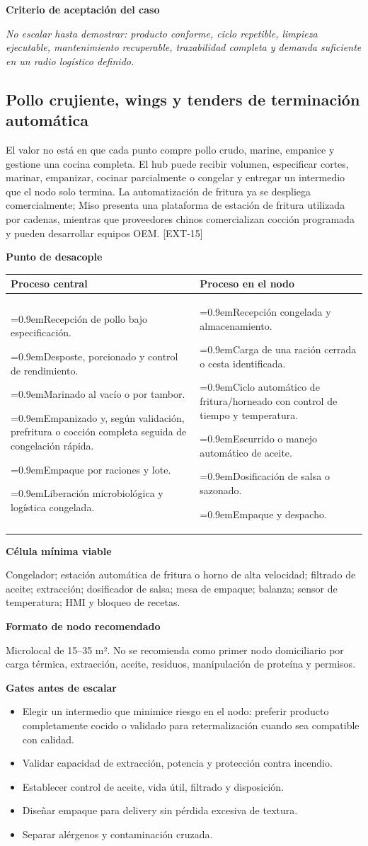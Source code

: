 \documentclass[11pt,a4paper]{article}
\makeatletter
\newcommand{\etiqueta}[1]{\par\medskip\noindent\textbf{#1}\par\nopagebreak\smallskip}
\newcommand{\ti}{\par\hangindent=0.9em\hangafter=1\noindent\makebox[0.9em][l]{\textbullet}}
\newcommand{\desacople}[2]{\etiqueta{Punto de desacople}
  {\small\noindent\begin{tabularx}{\textwidth}{@{}>{\raggedright\arraybackslash}X>{\raggedright\arraybackslash}X@{}}
  \toprule \textbf{Proceso central} & \textbf{Proceso en el nodo}\\ \midrule
  #1 & #2\\ \bottomrule\end{tabularx}}\par}
\newcommand{\criterio}{\etiqueta{Criterio de aceptación del caso}
  \noindent\textit{No escalar hasta demostrar: producto conforme, ciclo repetible, limpieza ejecutable,
  mantenimiento recuperable, trazabilidad completa y demanda suficiente en un radio logístico definido.}\par}
\makeatother
\begin{document}
\criterio

\subsection{Pollo crujiente, wings y tenders de terminación automática}
El valor no está en que cada punto compre pollo crudo, marine, empanice y gestione una cocina completa. El
hub puede recibir volumen, especificar cortes, marinar, empanizar, cocinar parcialmente o congelar y
entregar un intermedio que el nodo solo termina. La automatización de fritura ya se despliega
comercialmente; Miso presenta una plataforma de estación de fritura utilizada por cadenas, mientras que
proveedores chinos comercializan cocción programada y pueden desarrollar equipos OEM. [EXT-15]

\desacople{%
\ti Recepción de pollo bajo especificación.
\ti Desposte, porcionado y control de rendimiento.
\ti Marinado al vacío o por tambor.
\ti Empanizado y, según validación, prefritura o cocción completa seguida de congelación rápida.
\ti Empaque por raciones y lote.
\ti Liberación microbiológica y logística congelada.}{%
\ti Recepción congelada y almacenamiento.
\ti Carga de una ración cerrada o cesta identificada.
\ti Ciclo automático de fritura/horneado con control de tiempo y temperatura.
\ti Escurrido o manejo automático de aceite.
\ti Dosificación de salsa o sazonado.
\ti Empaque y despacho.}

\etiqueta{Célula mínima viable}
Congelador; estación automática de fritura o horno de alta velocidad; filtrado de aceite; extracción;
dosificador de salsa; mesa de empaque; balanza; sensor de temperatura; HMI y bloqueo de recetas.

\etiqueta{Formato de nodo recomendado}
Microlocal de 15--35 m². No se recomienda como primer nodo domiciliario por carga térmica, extracción,
aceite, residuos, manipulación de proteína y permisos.

\etiqueta{Gates antes de escalar}
\begin{itemize}
\item Elegir un intermedio que minimice riesgo en el nodo: preferir producto completamente cocido o
validado para retermalización cuando sea compatible con calidad.
\item Validar capacidad de extracción, potencia y protección contra incendio.
\item Establecer control de aceite, vida útil, filtrado y disposición.
\item Diseñar empaque para delivery sin pérdida excesiva de textura.
\item Separar alérgenos y contaminación cruzada.
\end{itemize}
\end{document}
